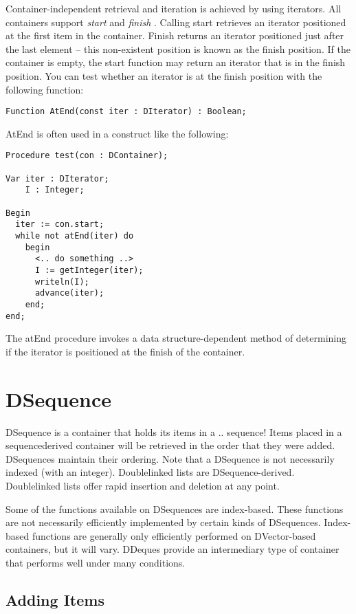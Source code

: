 \documentclass{report}
\begin{document}
Container-independent retrieval and iteration is achieved by using
iterators. All containers support \emph{start} and \emph{finish} . Calling
start retrieves an iterator positioned at the first item in the container.
Finish returns an iterator positioned just after the last element -- this
non-existent position is known as the finish position. If the container is
empty, the start function may return an iterator that is in the finish
position. You can test whether an iterator is at the finish position with
the following function:

\begin{lstlisting}
Function AtEnd(const iter : DIterator) : Boolean;
\end{lstlisting}

AtEnd is often used in a construct like the following:

\begin{lstlisting}
Procedure test(con : DContainer);

Var iter : DIterator;
    I : Integer;

Begin
  iter := con.start;
  while not atEnd(iter) do
    begin
      <.. do something ..>
      I := getInteger(iter);
      writeln(I);
      advance(iter);
    end;
end;
\end{lstlisting}

The atEnd procedure invokes a data structure-dependent method of determining
if the iterator is positioned at the finish of the container.

\section{DSequence}

DSequence is a container that holds its items in a .. sequence! Items placed
in a sequencederived container will be retrieved in the order that they were
added. DSequences maintain their ordering. Note that a DSequence is not
necessarily indexed (with an integer). Doublelinked lists are
DSequence-derived. Doublelinked lists offer rapid insertion and deletion at
any point.

Some of the functions available on DSequences are index-based.  These
functions are not necessarily efficiently implemented by certain kinds of
DSequences.  Index-based functions are generally only efficiently performed
on DVector-based containers, but it will vary. DDeques provide an
intermediary type of container that performs well under many conditions.

\subsection{Adding Items}
\end{document}
